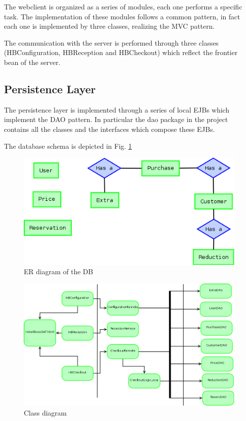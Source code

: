 \documentclass [11pt]{article}
\begin{document}
The webclient is organized as a series of modules, each one performs a
specific task. The implementation of these modules follows a common
pattern, in fact each one is implemented by three classes, realizing the
MVC pattern.

The communication with the server is performed through three classes
(HBConfiguration, HBReception and HBCheckout) which reflect the frontier
bean of the server.

\subsection{Persistence Layer}
The persistence layer is implemented through a series of local EJBs which
implement the DAO pattern.
In particular the dao package in the project contains all the classes and
the interfaces which compose these EJBs.

The database schema is depicted in Fig. \ref{fig:er}

\begin{figure}[h]
\includegraphics[width=\textwidth]{images/er.png}
\caption {ER diagram of the DB}
\label {fig:er}
\end{figure}


\begin{figure}[h]
\includegraphics[width=\textwidth]{images/class.png}
\caption{Class diagram}
\label {fig:class}
\end{figure}
\end{document}
